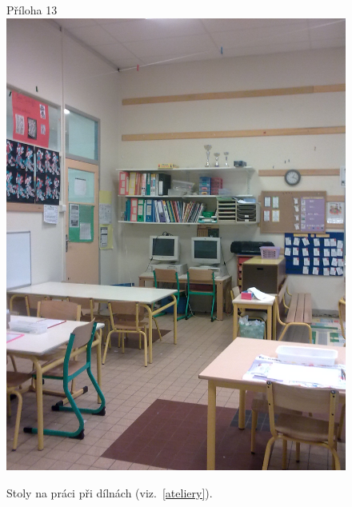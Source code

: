 	\begin{figure}[tb]
		\centering
		Příloha 13\\
		\includegraphics[height=0.35\textheight]{./fotky/Obr13.jpg}
		\caption{
			Stoly na práci při dílnách (viz.~\ref{ateliery}).
		}
		\label{Obr13}
	\end{figure}
